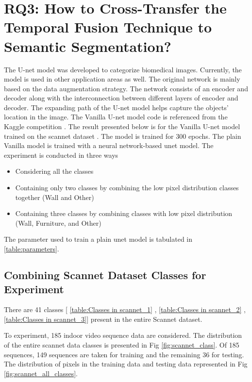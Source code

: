     \section{RQ3: How to Cross-Transfer the Temporal Fusion Technique to Semantic Segmentation?}
    
    The U-net model was developed to categorize biomedical images. Currently, the model is used in other application areas as well. The original network is mainly based on the data augmentation strategy. The network consists of an encoder and decoder along with the interconnection between different layers of encoder and decoder. The expanding path of the U-net model helps capture the objects' location in the image. The Vanilla U-net model code is referenced from the Kaggle competition \cite{85_kag_challenge}. The result presented below is for the Vanilla U-net model trained on the scannet dataset \cite{79_dai2017scannet}. The model is trained for 300 epochs. The plain Vanilla model is trained with a neural network-based unet model. The experiment is conducted in three ways
    \begin{itemize}
    	\item Considering all the classes
    	\item Containing only two classes by combining the low pixel distribution classes together (Wall and Other)
    	\item Containing three classes by combining classes with low pixel distribution (Wall, Furniture, and Other)
    \end{itemize}
    
    
    The parameter used to train a plain unet model is tabulated in \ref{table:parameters}.
    
    \subsection{Combining Scannet Dataset Classes for Experiment}
    
	There are 41 classes [ \ref{table:Classes in scannet_1} , \ref{table:Classes in scannet_2} , \ref{table:Classes in scannet_3}] present in the entire Scannet dataset. 

	To experiment, 185 indoor video sequence data are considered. The distribution of the entire scannet data classes is presented in Fig \ref{fig:scannet_class}. Of 185 sequences, 149 sequences are taken for training and the remaining 36 for testing. The distribution of pixels in the training data and testing data represented in Fig \ref{fig:scannet_all_classes}.
	
